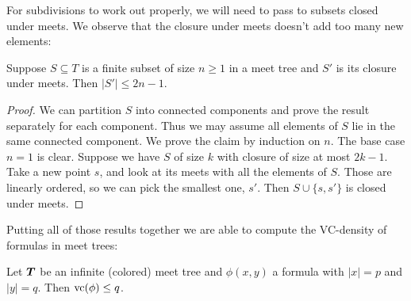 For subdivisions to work out properly, we will need to pass to subsets closed under meets. We observe that the closure under meets doesn't add too many new elements:
\begin{Lemma} \label{lm_meet}
  Suppose $S \subseteq T$ is a finite subset of size $n \geq 1$ in a meet tree and $S'$ is its closure under meets. Then $|S'| \leq 2n - 1$.
\end{Lemma}
\begin{proof}
  We can partition $S$ into connected components and prove the result separately for each component. Thus we may assume all elements of $S$ lie in the same connected component. We prove the claim by induction on $n$. The base case $n = 1$ is clear. Suppose we have $S$ of size $k$ with closure of size at most $2k - 1$. Take a new point $s$, and look at its meets with all the elements of $S$.
  Those are linearly ordered, so we can pick the smallest one, $s'$.
  Then $S \cup \{s, s'\}$ is closed under meets.
\end{proof}

Putting all of those results together we are able to compute the VC-density of formulas in meet trees:
\begin{Theorem}
  Let $\operatorname{\boldsymbol T}$ be an infinite (colored) meet tree and $\phi(x, y)$ a formula with $|x| = p$ and $|y| = q$. Then $\operatorname{vc}(\phi) \leq q$.
\end{Theorem}

